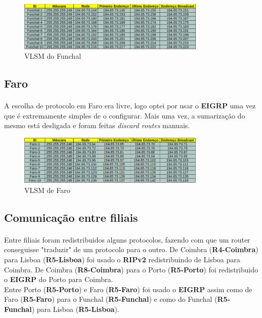 \documentclass[11pt]{article}
\begin{document}
	\begin{figure}[h]
		\centering
		\includegraphics[width=0.8\textwidth]{vlsm-funchal}
		\caption{VLSM do Funchal}
		\label{fig.nav}
	\end{figure}


	\subsection{Faro}
	\normalsize
	\paragraph{}
	A escolha de protocolo em Faro era livre, logo optei por usar o \textbf{EIGRP} uma vez que é extremamente simples de o configurar. Mais uma vez, a sumarização do mesmo está desligada e foram feitas \emph{discard routes} manuais.

	\begin{figure}[h]
		\centering
		\includegraphics[width=0.8\textwidth]{vlsm-faro}
		\caption{VLSM de Faro}
		\label{fig.nav}
	\end{figure}

	\subsection{Comunicação entre filiais}
	\normalsize
	\paragraph{}
	Entre filiais foram redistribuidos alguns protocolos, fazendo com que um router conseguisse "traduzir" de um protocolo para o outro. De Coimbra (\textbf{R4-Coimbra}) para Lisboa (\textbf{R5-Lisboa}) foi usado o \textbf{RIPv2} redistribuindo de Lisboa para Coimbra. De Coimbra (\textbf{R8-Coimbra}) para o Porto (\textbf{R5-Porto}) foi redistribuido o \textbf{EIGRP} do Porto para Coimbra. \\
	Entre Porto (\textbf{R5-Porto}) e Faro (\textbf{R5-Faro}) foi usado o \textbf{EIGRP} assim como de Faro (\textbf{R5-Faro}) para o Funchal (\textbf{R5-Funchal}) e como do Funchal (\textbf{R5-Funchal}) para Lisboa (\textbf{R5-Lisboa}).    
	
\end{document}
